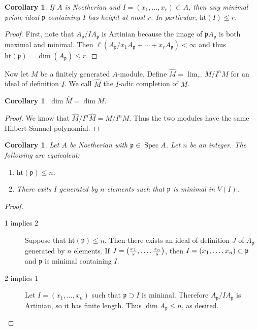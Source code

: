 \documentclass[leqno, openany]{memoir}
\newtheorem{cor}[thm]{Corollary}
\theoremstyle{definition}
\theoremstyle{remark}
\theoremstyle{plain}
\theoremstyle{definition}
\theoremstyle{remark}
\newcommand{\mf}[1]{\mathfrak{#1}}
\newcommand{\mr}[1]{\mathrm{#1}}
\newcommand{\wh}[1]{\widehat{#1}}
\DeclareMathOperator{\Spec}{Spec}
\begin{document}
\begin{cor}
    If $A$ is Noetherian and $I = (x_1, \ldots, x_r) \subset A$, then any minimal prime ideal $\mf{p}$ containing $I$ has height at most $r$. In particular, $\mr{ht}(I) \leq r$.
\end{cor}

\begin{proof}
    First, note that $A_{\mf{p}} / IA_{\mf{p}}$ is Artinian because the image of
    $\mf{p}A_{\mf{p}}$ is both maximal and minimal. Then $\ell(A_{\mf{p}} / x_1 A_{\mf{p}} + \cdots + x_r A_{\mf{p}}) < \infty$ and thus $\mr{ht}(\mf{p}) = \dim(A_{\mf{p}}) \leq r$.
\end{proof}

Now let $M$ be a finitely generated $A$-module. Define $\wh{M} = \lim_{\gets} M / I^n M$ for an ideal of definition $I$. We call $\wh{M}$ the $I$-adic completion of $M$.

\begin{cor}
    $\dim \wh{M} = \dim M$.
\end{cor}

\begin{proof}
    We know that $\wh{M} / I^n \wh{M} = M / I^nM$. Thus the two modules have the same Hilbert-Samuel polynomial.
\end{proof}

\begin{cor}
    Let $A$ be Noetherian with $\mf{p} \in \Spec A$. Let $n$ be an integer. The following are equivalent:
    \begin{enumerate}
        \item $\mr{ht}(\mf{p}) \leq n$.
        \item There exits $I$ generated by $n$ elements such that $\mf{p}$ is minimal in $V(I)$.
    \end{enumerate}
\end{cor}

\begin{proof}
    \begin{description}
        \item[1 implies 2] Suppose that $\mr{ht}(\mf{p}) \leq n$. Then there exists an ideal of definition $J$ of $A_{\mf{p}}$ generated by $n$ elements. If $J = \qty( \frac{x_1}{s}, \ldots, \frac{x_n}{s} )$, then $I = \qty(x_1, \ldots, x_n) \subset \mf{p}$ and $\mf{p}$ is minimal containing $I$.
        \item[2 implies 1] Let $I = (x_1, \ldots, x_n)$ such that $\mf{p} \supset I$ is minimal. Therefore $A_{\mf{p}} / IA_{\mf{p}}$ is Artinian, so it has finite length. Thus $\dim A_{\mf{p}} \leq n$, as desired. \qedhere
    \end{description}
\end{proof}
\end{document}
